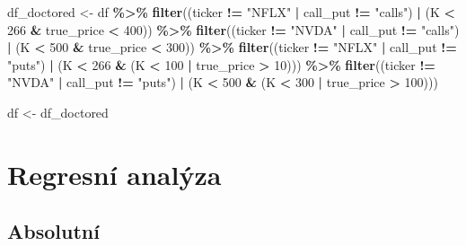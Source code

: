 \documentclass[
]{article}
\author{}
\date{\vspace{-2.5em}}
\newenvironment{Shaded}{\begin{snugshade}}{\end{snugshade}}
\newcommand{\DecValTok}[1]{\textcolor[rgb]{0.00,0.00,0.81}{#1}}
\newcommand{\FunctionTok}[1]{\textcolor[rgb]{0.13,0.29,0.53}{\textbf{#1}}}
\newcommand{\NormalTok}[1]{#1}
\newcommand{\OtherTok}[1]{\textcolor[rgb]{0.56,0.35,0.01}{#1}}
\newcommand{\SpecialCharTok}[1]{\textcolor[rgb]{0.81,0.36,0.00}{\textbf{#1}}}
\newcommand{\StringTok}[1]{\textcolor[rgb]{0.31,0.60,0.02}{#1}}
\begin{document}
\begin{Shaded}
\begin{Highlighting}[]
\NormalTok{df\_doctored }\OtherTok{\textless{}{-}}\NormalTok{ df }\SpecialCharTok{\%\textgreater{}\%}
  \FunctionTok{filter}\NormalTok{((ticker }\SpecialCharTok{!=} \StringTok{"NFLX"} \SpecialCharTok{|}\NormalTok{ call\_put }\SpecialCharTok{!=} \StringTok{"calls"}\NormalTok{) }\SpecialCharTok{|}\NormalTok{ (K }\SpecialCharTok{\textless{}} \DecValTok{266} \SpecialCharTok{\&}\NormalTok{ true\_price }\SpecialCharTok{\textless{}} \DecValTok{400}\NormalTok{)) }\SpecialCharTok{\%\textgreater{}\%}
  \FunctionTok{filter}\NormalTok{((ticker }\SpecialCharTok{!=} \StringTok{"NVDA"} \SpecialCharTok{|}\NormalTok{ call\_put }\SpecialCharTok{!=} \StringTok{"calls"}\NormalTok{) }\SpecialCharTok{|}\NormalTok{ (K }\SpecialCharTok{\textless{}} \DecValTok{500} \SpecialCharTok{\&}\NormalTok{ true\_price }\SpecialCharTok{\textless{}} \DecValTok{300}\NormalTok{)) }\SpecialCharTok{\%\textgreater{}\%}
  \FunctionTok{filter}\NormalTok{((ticker }\SpecialCharTok{!=} \StringTok{"NFLX"} \SpecialCharTok{|}\NormalTok{ call\_put }\SpecialCharTok{!=} \StringTok{"puts"}\NormalTok{) }\SpecialCharTok{|}\NormalTok{ (K }\SpecialCharTok{\textless{}} \DecValTok{266} \SpecialCharTok{\&}\NormalTok{ (K }\SpecialCharTok{\textless{}} \DecValTok{100} \SpecialCharTok{|}\NormalTok{ true\_price }\SpecialCharTok{\textgreater{}} \DecValTok{10}\NormalTok{))) }\SpecialCharTok{\%\textgreater{}\%}
  \FunctionTok{filter}\NormalTok{((ticker }\SpecialCharTok{!=} \StringTok{"NVDA"} \SpecialCharTok{|}\NormalTok{ call\_put }\SpecialCharTok{!=} \StringTok{"puts"}\NormalTok{) }\SpecialCharTok{|}\NormalTok{ (K }\SpecialCharTok{\textless{}} \DecValTok{500} \SpecialCharTok{\&}\NormalTok{ (K }\SpecialCharTok{\textless{}} \DecValTok{300} \SpecialCharTok{|}\NormalTok{ true\_price }\SpecialCharTok{\textgreater{}} \DecValTok{100}\NormalTok{)))}

\NormalTok{df }\OtherTok{\textless{}{-}}\NormalTok{ df\_doctored}
\end{Highlighting}
\end{Shaded}

\section{Regresní analýza}\label{regresnuxed-analuxfdza}

\subsection{Absolutní}\label{absolutnuxed}
\end{document}
